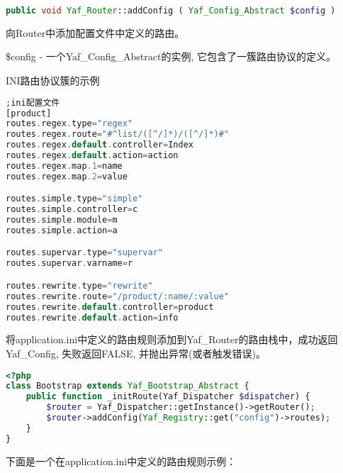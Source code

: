 \begin{lstlisting}[language=PHP]
public void Yaf_Router::addConfig ( Yaf_Config_Abstract $config )
\end{lstlisting}

向Router中添加配置文件中定义的路由。


\begin{compactitem}
\item \$config - 一个Yaf\_Config\_Abstract的实例, 它包含了一簇路由协议的定义。
\end{compactitem}


\begin{example}
INI路由协议簇的示例
\begin{lstlisting}[language=PHP]
;ini配置文件
[product]
routes.regex.type="regex"
routes.regex.route="#^list/([^/]*)/([^/]*)#"
routes.regex.default.controller=Index
routes.regex.default.action=action
routes.regex.map.1=name
routes.regex.map.2=value

routes.simple.type="simple"
routes.simple.controller=c
routes.simple.module=m
routes.simple.action=a

routes.supervar.type="supervar"
routes.supervar.varname=r

routes.rewrite.type="rewrite"
routes.rewrite.route="/product/:name/:value"
routes.rewrite.default.controller=product
routes.rewrite.default.action=info
\end{lstlisting}
\end{example}



将application.ini中定义的路由规则添加到Yaf\_Router的路由栈中，成功返回Yaf\_Config, 失败返回FALSE, 并抛出异常(或者触发错误)。

\begin{lstlisting}[language=PHP]
<?php
class Bootstrap extends Yaf_Bootstrap_Abstract {
    public function _initRoute(Yaf_Dispatcher $dispatcher) {
        $router = Yaf_Dispatcher::getInstance()->getRouter();
        $router->addConfig(Yaf_Registry::get("config")->routes);
    }
}
\end{lstlisting}



下面是一个在application.ini中定义的路由规则示例：


